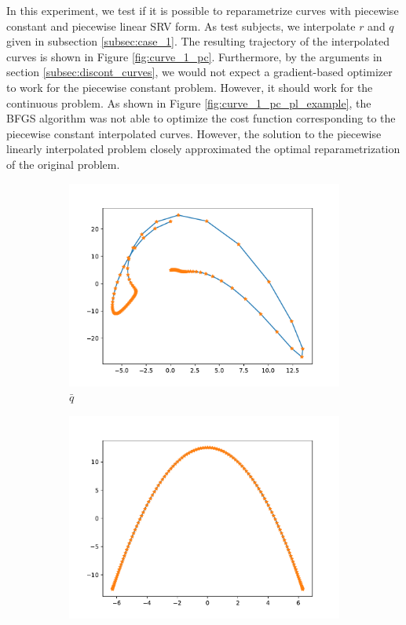In this experiment, we test if it is possible to reparametrize curves with piecewise constant and piecewise linear SRV form. As test subjects, we interpolate \(r\) and \(q\) given in subsection \ref{subsec:case_1}. The resulting trajectory of the interpolated curves is shown in Figure \ref{fig:curve_1_pc}. Furthermore, by the arguments in section \ref{subsec:discont_curves}, we would not expect a gradient-based optimizer to work for the piecewise constant problem. However, it should work for the continuous problem. As shown in Figure \ref{fig:curve_1_pc_pl_example}, the BFGS algorithm was not able to optimize the cost function corresponding to the piecewise constant interpolated curves. However, the solution to the piecewise linearly interpolated problem closely approximated the optimal reparametrization of the original problem.
\begin{figure}[b]
    \begin{subfigure}[t]{0.5\textwidth}
        \centering
        \includegraphics[width=\linewidth]{figures/curve_1_pc/curve_q_pc.pdf}
        \caption{\(\bar q\)}\label{fig:curve_1_pc_q}
    \end{subfigure}
    \begin{subfigure}[t]{0.5\textwidth}
        \centering
        \includegraphics[width=\linewidth]{figures/curve_1_pc/curve_r_pc.pdf}

\end{subfigure}
\end{figure}
